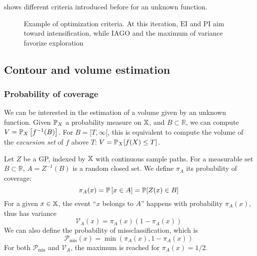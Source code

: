 \documentclass[../../Main_ManuscritThese.tex]{subfiles}
\newcommand\imgpath{/home/victor/acadwriting/Manuscrit/Text/Chapter4/img/}
\begin{document}
 shows different criteria introduced before for an unknown function.
\begin{figure}[ht!]
  \centering
  
  \caption[Optimization criteria for GP]{\label{fig:example_optimization_criteria} Example of optimization criteria. At this iteration, $\mathrm{EI}$ and $\mathrm{PI}$ aim toward intensification, while $\mathrm{IAGO}$ and the maximum of variance favorize exploration}
\end{figure}


 \clearpage
\subsection{Contour and volume estimation}
\label{sec:GP_vol_estim}

\subsubsection{Probability of coverage}
We can be interested in the estimation of a volume given by an unknown function. Given $\mathbb{P}_{X}$ a probability measure on $\mathbb{X}$, and $B\subset \mathbb{R}$, we can compute $V=\mathbb{P}_{X}\left[f^{-1}(B)\right]$. For $B = [T, \infty[$, this is equivalent to compute the volume of the \emph{excursion set} of $f$ above $T$: $V=\mathbb{P}_{X}[f(X) \leq T]$.


Let $Z$ be a GP, indexed by $\mathbb{X}$ with continuous sample paths. For a measurable set $B\subset \mathbb{R}$, $A = Z^{-1}(B)$ is a random closed set.
We define $\pi_A$ its probability of coverage:
\begin{equation}
  \pi_A(x) = \mathbb{P}\left[x\in A\right] = \mathbb{P}[Z(x) \in B]
\end{equation}
For a given $x\in\mathbb{X}$, the event ``$x$ belongs to $A$'' happens with probability $\pi_A(x)$, thus has variance
\begin{equation}
\mathscr{V}_A(x)=\pi_A(x)(1 - \pi_A(x))
\end{equation}
We can also define the probability of missclassification, which is
\begin{equation}
\mathscr{P}_{\mathrm{mis}}(x) = \min(\pi_A(x), 1-\pi_A(x))
\end{equation}
For both $\mathscr{P}_{\mathrm{mis}}$ and $\mathscr{V}_A$, the maximum is reached for $\pi_A(x) = 1/2$.
\end{document}
